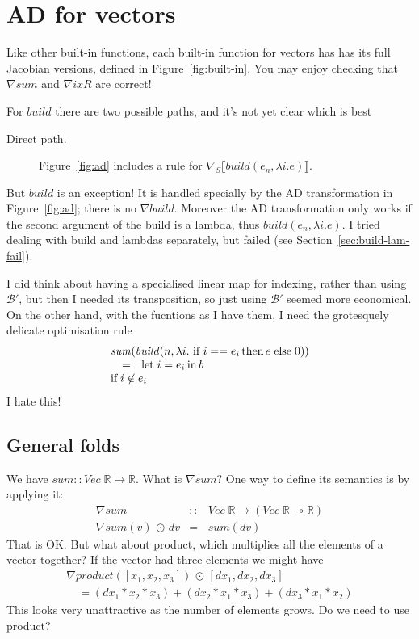 \documentclass[sigplan,review]{acmart}
\renewcommand{\to}{\rightarrow}    %
\newcommand{\linto}{\multimap}     %
\newcommand{\grad}[1]{\nabla_S\lb #1 \rb}  %
\newcommand{\gradf}[1]{\nabla\! #1}  %
\newcommand{\lb}{\llbracket}
\newcommand{\rb}{\rrbracket}
\newcommand{\buildfun}{\mathit{build}}
\newcommand{\sumfunname}{\mathit{sum}}   %
\newcommand{\sumfun}[1]{\sumfunname(#1)}   %
\newcommand{\indexfunname}{\mathit{ixR}} %
\renewcommand{\vector}[1]{\mathit{Vec}\;#1}
\newcommand{\real}{\mathbb{R}}       %
\newcommand{\lmcomp}{\,\circ\,}   %
\newcommand{\lmapply}{\,\odot\,}      %
\newcommand{\lmbuildt}{\mathcal B'}             %
\begin{document}
\section{AD for vectors} \label{sec:ad-vectors}

Like other built-in functions, each built-in function for vectors
has has its full Jacobian versions, defined in Figure~\ref{fig:built-in}.
You may enjoy checking that $\gradf{\sumfunname}$ and
$\gradf{\indexfunname}$ are correct! 

For $\buildfun$ there are two possible paths, and it's not yet clear
which is best
\begin{description}
\item[Direct path.]  Figure~\ref{fig:ad} includes a rule
  for $\grad{\buildfun(e_n, \lambda i.e)}$.
\end{description}
But $\buildfun$ is an exception!  It is handled specially
by the AD transformation in Figure~\ref{fig:ad}; there is no $\gradf{\buildfun}$.
Moreover the AD transformation only works if the second argument of the build is
a lambda, thus $\buildfun(e_n, \lambda i.e)$.  I tried dealing with build and
lambdas separately, but failed (see Section~\ref{sec:build-lam-fail}).

I did think about having a specialised linear map for indexing, rather
than using $\lmbuildt$, but then I needed its transposition, so just
using $\lmbuildt$ seemed more economical.  On the other hand, with the
fucntions as I have them, I need the grotesquely delicate optimisation
rule
$$
\begin{array}{l}
\sumfun{\buildfun( n, \lambda i.\, \mbox{\lstinline|if|} \, i == e_i \,
     \mbox{\lstinline|then|} \, e \,
     \mbox{\lstinline|else|} \, 0 )} \\
\quad = \;\; \mbox{\lstinline|let|}\, i = e_i \, \mbox{\lstinline|in|}\, b \\
\mbox{if} \; i \not\in e_i
\end{array}
$$
I hate this!

\subsection{General folds} \label{sec:gen-fold}

We have $\sumfunname :: \vector{\real} \to \real$.  What is $\gradf{\sumfunname}$?
One way to define its semantics is by applying it:
$$
\begin{array}{rcl}
  \gradf{\sumfunname} & :: & \vector{\real} \to (\vector{\real} \linto \real) \\
  \gradf{\sumfunname}(v) \lmapply dv & = & \sumfun{dv}
\end{array}
$$
That is OK.  But what about product, which multiplies all the elements
of a vector together? If the vector had three elements we might have
$$
\begin{array}{l}
  \gradf{product}([x_1,x_2,x_3]) \lmapply [dx_1, dx_2, dx_3] \\
  \quad = (dx_1 * x_2 * x_3) + (dx_2 * x_1 * x_3) + (dx_3 * x_1 * x_2)
\end{array}
$$
This looks very unattractive as the number of elements grows.  Do we need
to use product?
\end{document}
